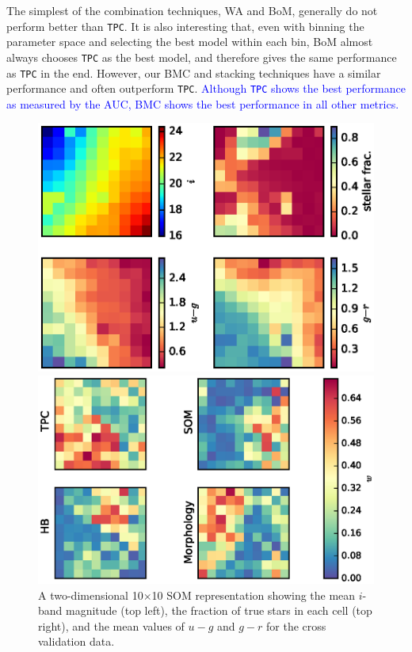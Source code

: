 \documentclass[useAMS,usenatbib]{mn2e}
\begin{document}
The simplest of the combination techniques, WA and BoM,
generally do not perform better than \texttt{TPC}.
It is also interesting that,
even with binning the parameter space and selecting the best model
within each bin,
BoM almost always chooses \texttt{TPC} as the best model,
and therefore gives the same performance as \texttt{TPC} in the end.
However, our BMC and stacking techniques have a similar performance
and often outperform \texttt{TPC}.
\textcolor{blue}{
Although \texttt{TPC} shows the best performance as measured by the AUC,
BMC shows the best performance in all other metrics.
}

\begin{figure}
  \begin{minipage}[b]{0.49\linewidth}
    \includegraphics[width=\textwidth]{figures/som_colors.eps}
    \caption{A two-dimensional 10$\times$10 SOM representation
             showing the mean $i$-band magnitude (top left),
             the fraction of true stars in each cell (top right),
             and the mean values of $u-g$ and $g-r$
             for the cross validation data.}
    \label{fig:som_colors}
  \end{minipage}
  \hfill
  \begin{minipage}[b]{0.49\linewidth}
    \includegraphics[width=\textwidth]{figures/weights.eps}

\end{minipage}
\end{figure}
\end{document}
